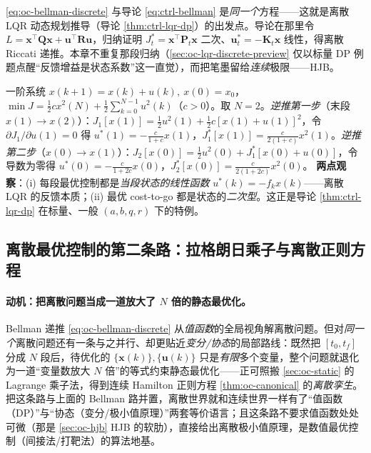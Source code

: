 \begin{insight}
\cref{eq:oc-bellman-discrete} 与导论 \cref{eq:ctrl-bellman} 是\emph{同一个}方程——这就是离散 LQR 动态规划推导（导论 \cref{thm:ctrl-lqr-dp}）的出发点。导论在那里令 $L=\mathbf x^\top\mathbf Q\mathbf x+\mathbf u^\top\mathbf R\mathbf u$，归纳证明 $J_t^*=\mathbf x^\top\mathbf P_t\mathbf x$ 二次、$\mathbf u_t^*=-\mathbf K_t\mathbf x$ 线性，得离散 Riccati 递推。本章不重复那段归纳（\cref{sec:oc-lqr-discrete-preview} 仅以标量 DP 例题点醒“反馈增益是状态系数”这一直觉），而把笔墨留给\emph{连续}极限——HJB。
\end{insight}

\begin{example}\label{ex:oc-dp-scalar}
一阶系统 $x(k+1)=x(k)+u(k),\ x(0)=x_0$，$\min J=\tfrac12cx^2(N)+\tfrac12\sum_{k=0}^{N-1}u^2(k)$（$c>0$）。取 $N=2$。\emph{逆推第一步}（末段 $x(1)\to x(2)$）：$J_1[x(1)]=\tfrac12u^2(1)+\tfrac12c[x(1)+u(1)]^2$，令 $\partial J_1/\partial u(1)=0$ 得 $u^*(1)=-\tfrac{c}{1+c}x(1)$，$J_1^*[x(1)]=\tfrac{c}{2(1+c)}x^2(1)$。\emph{逆推第二步}（$x(0)\to x(1)$）：$J_2[x(0)]=\tfrac12u^2(0)+J_1^*[x(0)+u(0)]$，令导数为零得 $u^*(0)=-\tfrac{c}{1+2c}x(0)$，$J_2^*[x(0)]=\tfrac{c}{2(1+2c)}x^2(0)$。
\textbf{两点观察}：(i) 每段最优控制都是\emph{当段状态的线性函数} $u^*(k)=-f_kx(k)$——离散 LQR 的反馈本质；(ii) 最优 cost-to-go 都是状态的\emph{二次型}。这正是导论 \cref{thm:ctrl-lqr-dp} 在标量、一般 $(a,b,q,r)$ 下的特例。
\end{example}

\subsection{离散最优控制的第二条路：拉格朗日乘子与离散正则方程}
\label{sec:oc-discrete-canonical}

\paragraph{动机：把离散问题当成一道放大了 $N$ 倍的静态最优化。}
Bellman 递推 \cref{eq:oc-bellman-discrete} 从\emph{值函数}的全局视角解离散问题。但对\emph{同一个}离散问题还有一条与之并行、却更贴近\emph{变分/协态}的局部路线：既然把 $[t_0,t_f]$ 分成 $N$ 段后，待优化的 $\{\mathbf x(k)\},\{\mathbf u(k)\}$ 只是\emph{有限}多个变量，整个问题就退化为一道“变量数放大 $N$ 倍”的等式约束静态最优化——正可照搬 \cref{sec:oc-static} 的 Lagrange 乘子法，得到连续 Hamilton 正则方程 \cref{thm:oc-canonical} 的\emph{离散孪生}\cite{liubao2006modern}。把这条路与上面的 Bellman 路并置，离散世界就和连续世界一样有了“值函数（DP）”与“协态（变分/极小值原理）”两套等价语言；且这条路不要求值函数处处可微（那是 \cref{sec:oc-hjb} HJB 的软肋），直接给出离散极小值原理，是数值最优控制（间接法/打靶法）的算法地基。

